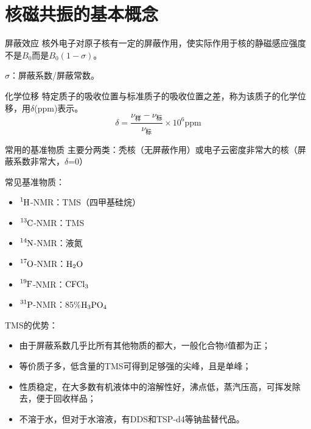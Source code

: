 \section{核磁共振的基本概念}
\begin{definition*}{屏蔽效应}{}
	核外电子对原子核有一定的屏蔽作用，使实际作用于核的静磁感应强度不是$B_0$而是$B_0(1-\sigma)$。 
	
	$\sigma$：屏蔽系数/屏蔽常数。
\end{definition*}

\begin{definition*}{化学位移}{}
	特定质子的吸收位置与标准质子的吸收位置之差，称为该质子的化学位移，用$\delta$(ppm)表示。
	\begin{equation*}
		\delta=\dfrac{\nu_{\text{样}}-\nu_{\text{标}}}{\nu_{\text{标}}}\times 10^6 \mathrm{ppm}
	\end{equation*}
\end{definition*}

\begin{emptytcb*}{常用的基准物质}{}
	主要分两类：秃核（无屏蔽作用）或电子云密度非常大的核（屏蔽系数非常大，$\delta$=0）
	
	常见基准物质： 
	\begin{itemize}
		\item $\ce{^{1}H}$-NMR：TMS（四甲基硅烷）	
		\item $\ce{^{13}C}$-NMR：TMS
		\item $\ce{^{14}N}$-NMR：液氮		
		\item $\ce{^{17}O}$-NMR：$\ce{H2O}$
		\item $\ce{^{19}F}$-NMR：$\ce{CFCl3}$
		\item $\ce{^{31}P}$-NMR：85\%$\ce{H3PO4}$
	\end{itemize}	
\end{emptytcb*}

TMS的优势：
\begin{itemize}
	\item 由于屏蔽系数几乎比所有其他物质的都大，一般化合物$\delta$值都为正；
	\item 等价质子多，低含量的TMS可得到足够强的尖峰，且是单峰；
	\item 性质稳定，在大多数有机液体中的溶解性好，沸点低，蒸汽压高，可挥发除去，便于回收样品；
	\item 不溶于水，但对于水溶液，有DDS和TSP-d4等钠盐替代品。
\end{itemize}

